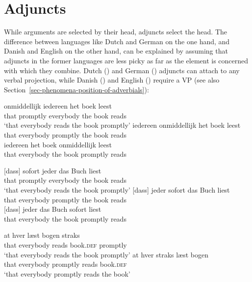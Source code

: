 \fi


\section{Adjuncts}
\label{sec-adjuncts}

While arguments are selected by their head, adjuncts select the head. The difference between
languages like Dutch and German on the one hand, and Danish and English on the other hand, can be
explained by assuming that adjuncts in the former languages are less picky as far as the element is
concerned with which they combine. Dutch () and German ()
adjuncts can attach to any verbal projection, while Danish () and English () require a
VP (see also Section~\ref{sec-phenomena-position-of-adverbials}):

\eal
\ex 
\gll [dat] onmiddellijk iedereen het boek leest\\
     \spacebr{}that promptly everybody the book reads\\\dutch
\glt `that everybody reads the book promptly'
\ex
\gll [dat] iedereen onmiddellijk het boek leest\\ 
     \spacebr{}that everybody promptly the book reads\\ 
\ex
\gll [dat] iedereen het boek onmiddellijk leest\\ 
    \spacebr{}that everybody the book promptly reads\\
\zl

\eal
\ex
\label{ex-m-j-b-l} 
\gll {}[dass] sofort jeder das Buch liest\\
     \spacebr{}that promptly everybody the book reads\\\german
\glt `that everybody reads the book promptly'
\ex
\label{ex-j-m-b-l} 
\gll {}[dass] jeder sofort das Buch liest\\
     \spacebr{}that everybody promptly the book reads\\ 
\ex
\label{ex-j-b-m-l}
\gll {}[dass] jeder das Buch sofort liest\\
    \spacebr{}that everybody the book promptly reads\\
\zl


\eal
\ex 
\gll at hver læst bogen straks\\
     that everybody reads book.\textsc{def} promptly\\ \danish
\glt `that everybody reads the book promptly'
\ex 
\gll at hver straks læst bogen\\
     that everybody promptly reads book.\textsc{def}\\
\glt `that everybody promptly reads the book'
\zl

